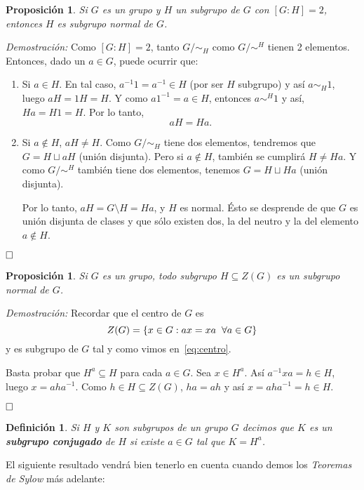 \documentclass[12pt]{article}
\newtheorem{proposition}[theorem]{Proposición}
\newtheorem{definition}[theorem]{Definición}
\begin{document}
\begin{proposition}Si $G$ es un grupo y $H$ un subgrupo de $G$ con $\left[ G:H \right] = 2$, entonces $H$ es subgrupo normal de $G$.
\end{proposition}
\emph{Demostración: }Como $\left[ G:H \right] = 2$, tanto $G/\sim_{H}$ como $G/\sim^{H}$ tienen 2 elementos. Entonces, dado un $a \in G$, puede ocurrir que:\begin{enumerate}
\item Si $a \in H$. En tal caso, $a^{-1}1 = a^{-1} \in H$ (por ser $H$ subgrupo) y así $a\sim_{H}1$, luego $aH = 1H = H.$ Y como $a1^{-1} = a \in H$, entonces $a\sim^{H}1$ y así, $Ha = H1 = H.$ Por lo tanto, $$aH = Ha.$$
\item Si $a \notin H$, $aH \neq H$. Como $G/\sim_{H}$ tiene dos elementos, tendremos que $G = H\sqcup aH$ (unión disjunta).
Pero si $a \notin H$, también se cumplirá $H \neq Ha$. Y como $G/\sim^{H}$ también tiene dos elementos, tenemos $ G = H \sqcup Ha$ (unión disjunta).

Por lo tanto, $aH = G\setminus H = Ha$, y $H$ es normal. Ésto se desprende de que $G$ es unión disjunta de clases y que sólo existen dos, la del neutro y la del elemento $a \notin H$.
\end{enumerate}
$\hfill \square$

\begin{proposition}Si $G$ es un grupo, todo subgrupo $H \subseteq Z(G)$ es un subgrupo normal de $G$.
\end{proposition}
\emph{Demostración: } Recordar que el centro de $G$ es $$Z(G) = \lbrace x \in G : ax = xa \hspace{0.2cm} \forall a \in G\rbrace$$ y es subgrupo de $G$ tal y como vimos en~\ref{eq:centro}.

Basta probar que $H^{a}\subseteq H$ para cada $a \in G$. Sea $x \in H^{a}$. Así $a^{-1}xa = h \in H$, luego $x = aha^{-1}$. Como $h \in H \subseteq Z(G)$, $ha = ah$ y así $x = aha^{-1} = h \in H.$

$\hfill \square$

\begin{definition}Si $H$ y $K$ son subgrupos de un grupo $G$ decimos que $K$ es un \textbf{subgrupo conjugado} de $H$ si existe $a \in G$ tal que $K =H^{a}$.
\end{definition}

El siguiente resultado vendrá bien tenerlo en cuenta cuando demos los \textit{Teoremas de Sylow} más adelante: 
\end{document}
